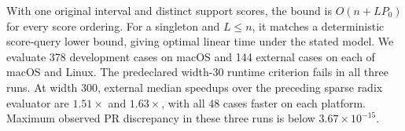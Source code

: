 With one original interval and distinct support scores, the bound is
$O(n+LP_0)$ for every score ordering. For a singleton and $L\le n$, it
matches a deterministic score-query lower bound, giving optimal linear time
under the stated model. We evaluate 378 development cases on macOS and 144
external cases on each of macOS and Linux. The predeclared width-30 runtime
criterion fails in all three runs. At width 300, external median speedups
over the preceding sparse radix evaluator are $1.51\times$ and $1.63\times$,
with all 48 cases faster on each platform. Maximum observed PR discrepancy
in these three runs is below $3.67\times10^{-15}$.
